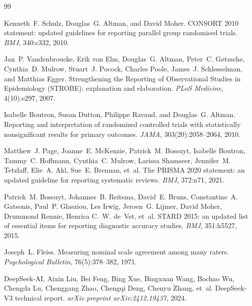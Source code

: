 \documentclass[11pt,a4paper]{article}
\begin{document}
\begin{thebibliography}{99}
\setlength{\itemsep}{1.8pt}

Kenneth~F. Schulz, Douglas~G. Altman, and David Moher.
\newblock CONSORT 2010 statement: updated guidelines for reporting parallel group randomised trials.
\newblock \emph{BMJ}, 340:c332, 2010.

Jan~P. Vandenbroucke, Erik von Elm, Douglas~G. Altman, Peter~C. G{\o}tzsche, Cynthia~D. Mulrow, Stuart~J. Pocock, Charles Poole, James~J. Schlesselman, and Matthias Egger.
\newblock Strengthening the Reporting of Observational Studies in Epidemiology (STROBE): explanation and elaboration.
\newblock \emph{PLoS Medicine}, 4(10):e297, 2007.

Isabelle Boutron, Susan Dutton, Philippe Ravaud, and Douglas~G. Altman.
\newblock Reporting and interpretation of randomized controlled trials with statistically nonsignificant results for primary outcomes.
\newblock \emph{JAMA}, 303(20):2058--2064, 2010.

Matthew~J. Page, Joanne~E. McKenzie, Patrick~M. Bossuyt, Isabelle Boutron, Tammy~C. Hoffmann, Cynthia~C. Mulrow, Larissa Shamseer, Jennifer~M. Tetzlaff, Elie~A. Akl, Sue~E. Brennan, et~al.
\newblock The PRISMA 2020 statement: an updated guideline for reporting systematic reviews.
\newblock \emph{BMJ}, 372:n71, 2021.

Patrick~M. Bossuyt, Johannes~B. Reitsma, David~E. Bruns, Constantine~A. Gatsonis, Paul~P. Glasziou, Les Irwig, Jeroen~G. Lijmer, David Moher, Drummond Rennie, Henrica C.~W. de~Vet, et~al.
\newblock STARD 2015: an updated list of essential items for reporting diagnostic accuracy studies.
\newblock \emph{BMJ}, 351:h5527, 2015.

Joseph~L. Fleiss.
\newblock Measuring nominal scale agreement among many raters.
\newblock \emph{Psychological Bulletin}, 76(5):378--382, 1971.

DeepSeek-AI, Aixin Liu, Bei Feng, Bing Xue, Bingxuan Wang, Bochao Wu, Chengda Lu, Chenggang Zhao, Chengqi Deng, Chenyu Zhang, et~al.
\newblock DeepSeek-V3 technical report.
\newblock \emph{arXiv preprint arXiv:2412.19437}, 2024.


\end{thebibliography}
\end{document}
